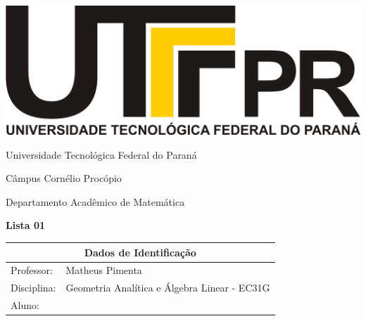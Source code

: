 \documentclass[oneside,a4paper,12pt]{article}
\newcommand{\universidade}{Universidade Tecnológica Federal do Paraná}
\newcommand{\centro}{Câmpus Cornélio Procópio}
\newcommand{\departamento}{Departamento Acadêmico de Matemática}
\newcommand{\curso}{Engenharia da Computação}
\newcommand{\professores}{Matheus Pimenta}
\newcommand{\disciplina}{Geometria Analítica e Álgebra Linear - EC31G}
\begin{document}
	\pagestyle{empty}
	
	\begin{center}
		\includegraphics[width=\linewidth/8]{logo.jpg}%
	 	\vspace{2pt} 	
		
		\universidade
		\par
		\centro
		\par
		\departamento
		\par
		\par
		\vspace{12pt}
		\LARGE \textbf{Lista 01}
		
	\end{center}
	
	\vspace{12pt}
	
	\begin{tabular}{ |l|p{12cm}| }
		
		\hline
		\multicolumn{2}{|c|}{\textbf{Dados de Identificação}} \\
		\hline
		Professor:         &    \professores           \\
		\hline
		Disciplina:        &    \disciplina          \\
		\hline
		Aluno:             &                   \\
		\hline
		
	\end{tabular}
	\vspace{6pt}
	
	
	\begin{snugshade}
	\end{snugshade}
\end{document}
